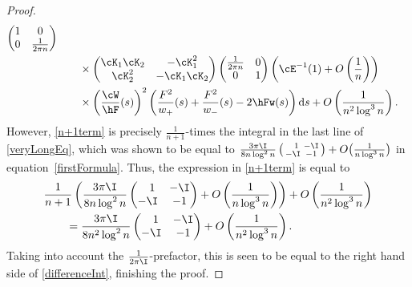 \begin{proof}
\begin{align}
 \begin{pmatrix}
 1 & 0
 \\
 0 & \frac{1}{2\pi n}
 \end{pmatrix}\nonumber
 \\
 &\qquad\times \begin{pmatrix}
 \cK_1\cK_2 & -\cK^2_1
 \\
 \cK^2_2 & -\cK_1\cK_2
 \end{pmatrix}
 \begin{pmatrix}
 \frac{1}{2\pi n} & 0
 \\
 0 & 1
 \end{pmatrix}
 \left( \cE^{-1}(1) + O\left( \frac{1}{n} \right)\right)\nonumber
 \\
 &\qquad\times
 \left(\frac{\cW}{\hF}(s)\right)^2
 \left(\frac{F^2}{w_+}(s)+\frac{F^2}{w_-}(s)-2\hFw(s)\right){\rm d}s
+O\left(\frac{1}{n^2\log^3 n}\right).\label{n+1term}
\end{align}
However, \eqref{n+1term} is precisely $\frac{1}{n+1}$-times the integral in the last line of \eqref{veryLongEq}, which was shown to be equal to $\frac{3\pi\I}{8n \log^2n} \left(\begin{smallmatrix}
\phantom{-}1 & -\I\\
-\I & -1
\end{smallmatrix}\right)+ O\big(\frac{1}{n\log^3 n}\big)$ in equation~\eqref{firstFormula}. Thus, the expression in \eqref{n+1term} is equal to
\begin{align*}
 &\frac{1}{n+1}\left(\frac{3\pi\I}{8n \log^2n} \begin{pmatrix}
\phantom{-}1 & -\I\\
-\I & -1
\end{pmatrix}+ O\left(\frac{1}{n\log^3 n}\right)\right)+ O\left(\frac{1}{n^2\log^3 n}\right)
\\
&\qquad=\frac{3\pi\I}{8n^2 \log^2n} \begin{pmatrix}
\phantom{-}1 & -\I\\
-\I & -1
\end{pmatrix}+ O\left(\frac{1}{n^2\log^3 n}\right).
\end{align*}
Taking into account the $\frac{1}{2\pi \I}$-prefactor, this is seen to be equal to the right hand side of \eqref{differenceInt}, finishing the proof.
\end{proof}
